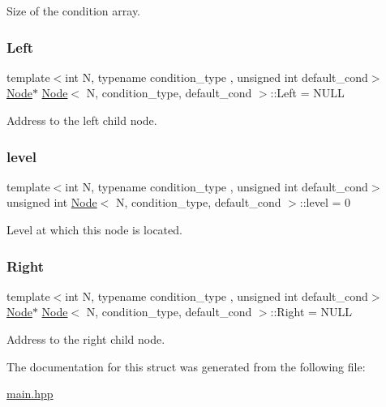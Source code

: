 Size of the {\ttfamily condition} array. \mbox{\label{struct_node_a779292dace788d33114830cca763ccf3}} 
\subsubsection{\texorpdfstring{Left}{Left}}
{\footnotesize\ttfamily template$<$int N, typename condition\+\_\+type , unsigned int default\+\_\+cond$>$ \\
\hyperlink{struct_node}{Node}$\ast$ \hyperlink{struct_node}{Node}$<$ N, condition\+\_\+type, default\+\_\+cond $>$\+::Left = N\+U\+LL}

Address to the left child node. \mbox{\label{struct_node_a64a379c6dd2c75ade9687670c517b7e7}} 
\subsubsection{\texorpdfstring{level}{level}}
{\footnotesize\ttfamily template$<$int N, typename condition\+\_\+type , unsigned int default\+\_\+cond$>$ \\
unsigned int \hyperlink{struct_node}{Node}$<$ N, condition\+\_\+type, default\+\_\+cond $>$\+::level = 0}

Level at which this node is located. \mbox{\label{struct_node_ae5ad7032e0a9a52f5a849e33e23a7dfa}} 
\subsubsection{\texorpdfstring{Right}{Right}}
{\footnotesize\ttfamily template$<$int N, typename condition\+\_\+type , unsigned int default\+\_\+cond$>$ \\
\hyperlink{struct_node}{Node}$\ast$ \hyperlink{struct_node}{Node}$<$ N, condition\+\_\+type, default\+\_\+cond $>$\+::Right = N\+U\+LL}

Address to the right child node. 

The documentation for this struct was generated from the following file\+:\begin{DoxyCompactItemize}
\item 
\hyperlink{main_8hpp}{main.\+hpp}\end{DoxyCompactItemize}
